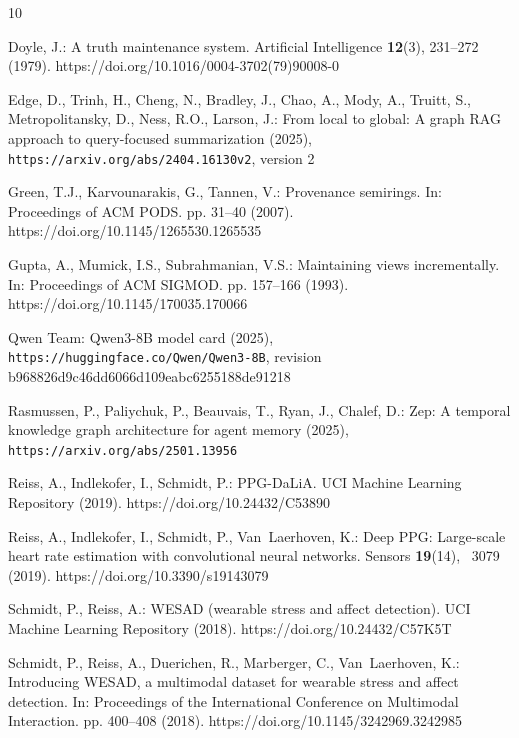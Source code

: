 \documentclass[runningheads]{llncs}
\begin{document}
 \clearpage
\label{page:references}
\begin{thebibliography}{10}
\providecommand{\url}[1]{\texttt{#1}}
\providecommand{\urlprefix}{URL }
\providecommand{\doi}[1]{https://doi.org/#1}

Doyle, J.: A truth maintenance system. Artificial Intelligence  \textbf{12}(3),
   231--272 (1979). \doi{10.1016/0004-3702(79)90008-0}

Edge, D., Trinh, H., Cheng, N., Bradley, J., Chao, A., Mody, A., Truitt, S.,
  Metropolitansky, D., Ness, R.O., Larson, J.: From local to global: A graph
  {RAG} approach to query-focused summarization (2025),
  \url{https://arxiv.org/abs/2404.16130v2}, version 2

Green, T.J., Karvounarakis, G., Tannen, V.: Provenance semirings. In:
  Proceedings of ACM PODS. pp. 31--40 (2007). \doi{10.1145/1265530.1265535}

Gupta, A., Mumick, I.S., Subrahmanian, V.S.: Maintaining views incrementally.
  In: Proceedings of ACM SIGMOD. pp. 157--166 (1993).
  \doi{10.1145/170035.170066}

{Qwen Team}: {Qwen3-8B} model card (2025),
  \url{https://huggingface.co/Qwen/Qwen3-8B}, revision
  b968826d9c46dd6066d109eabc6255188de91218

Rasmussen, P., Paliychuk, P., Beauvais, T., Ryan, J., Chalef, D.: Zep: A
  temporal knowledge graph architecture for agent memory (2025),
  \url{https://arxiv.org/abs/2501.13956}

Reiss, A., Indlekofer, I., Schmidt, P.: {PPG-DaLiA}. UCI Machine Learning
  Repository (2019). \doi{10.24432/C53890}

Reiss, A., Indlekofer, I., Schmidt, P., Van~Laerhoven, K.: Deep {PPG}:
  Large-scale heart rate estimation with convolutional neural networks. Sensors
   \textbf{19}(14), ~3079 (2019). \doi{10.3390/s19143079}

Schmidt, P., Reiss, A.: {WESAD} (wearable stress and affect detection). UCI
  Machine Learning Repository (2018). \doi{10.24432/C57K5T}

Schmidt, P., Reiss, A., Duerichen, R., Marberger, C., Van~Laerhoven, K.:
  Introducing {WESAD}, a multimodal dataset for wearable stress and affect
  detection. In: Proceedings of the International Conference on Multimodal
  Interaction. pp. 400--408 (2018). \doi{10.1145/3242969.3242985}


\end{thebibliography}
\end{document}
